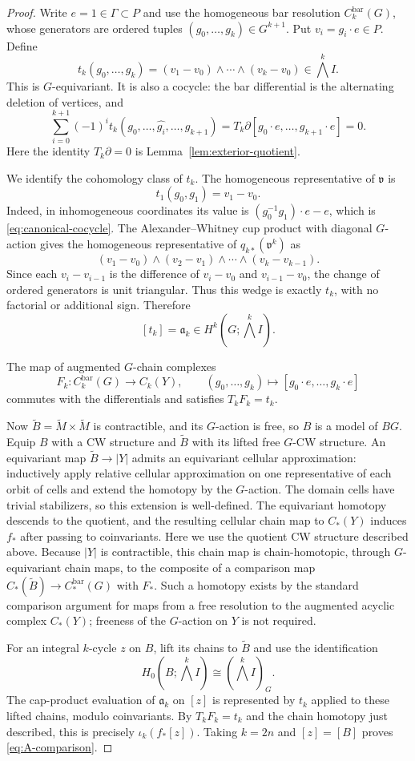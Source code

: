 \begin{proof}
Write $e=1\in\Gamma\subset P$ and use the homogeneous
bar resolution $C_k^{\mathrm{bar}}(G)$, whose generators
are ordered tuples $(g_0,\ldots,g_k)\in G^{k+1}$.
Put $v_i=g_i\cdot e\in P$. Define
\[
 t_k(g_0,\ldots,g_k)
  =(v_1-v_0)\wedge\cdots\wedge(v_k-v_0)
  \in\bigwedge^k I.
\]
This is $G$-equivariant. It is also a cocycle:
the bar differential is the alternating deletion
of vertices, and
\[
 \sum_{i=0}^{k+1}(-1)^i
 t_k(g_0,\ldots,\widehat{g_i},\ldots,g_{k+1})
 =T_k\partial[g_0\cdot e,\ldots,g_{k+1}\cdot e]
 =0.
\]
Here the identity $T_k\partial=0$ is
Lemma~\ref{lem:exterior-quotient}.

We identify the cohomology class of $t_k$. The
homogeneous representative of $\mathfrak v$ is
\[
 t_1(g_0,g_1)=v_1-v_0.
\]
Indeed, in inhomogeneous coordinates its value is
$(g_0^{-1}g_1)\cdot e-e$, which is
\eqref{eq:canonical-cocycle}.
The Alexander--Whitney cup product with diagonal
$G$-action gives the homogeneous representative
of $q_{k*}(\mathfrak v^k)$ as
\[
 (v_1-v_0)\wedge(v_2-v_1)\wedge\cdots
 \wedge(v_k-v_{k-1}).
\]
Since each $v_i-v_{i-1}$ is the difference of
$v_i-v_0$ and $v_{i-1}-v_0$, the change of
ordered generators is unit triangular. Thus this
wedge is exactly $t_k$, with no factorial or
additional sign. Therefore
\[
 [t_k]=\mathfrak a_k\in H^k(G;\bigwedge^k I).
\]

The map of augmented $G$-chain complexes
\[
 F_k:C_k^{\mathrm{bar}}(G)\longrightarrow C_k(Y),
 \qquad
 (g_0,\ldots,g_k)\longmapsto
 [g_0\cdot e,\ldots,g_k\cdot e]
\]
commutes with the differentials and satisfies
$T_k F_k=t_k$.

Now $\widetilde B=\widetilde M\times\widetilde M$
is contractible, and its $G$-action is free, so
$B$ is a model of $BG$. Equip $B$ with a CW structure and $\widetilde B$ with
its lifted free $G$-CW structure. An equivariant map
$\widetilde B\to |Y|$ admits an equivariant cellular
approximation: inductively apply relative cellular
approximation on one representative of each orbit of
cells and extend the homotopy by the $G$-action.
The domain cells have trivial stabilizers, so this
extension is well-defined. The equivariant homotopy
descends to the quotient, and the resulting cellular
chain map to $C_*(Y)$ induces $f_*$ after passing to
coinvariants. Here we use the quotient CW structure
described above.
Because $|Y|$ is contractible, this chain map
is chain-homotopic, through $G$-equivariant
chain maps, to the composite of a comparison
map $C_*(\widetilde B)\to C_*^{\mathrm{bar}}(G)$
with $F_*$. Such a homotopy exists by
the standard comparison argument for maps
from a free resolution to the augmented
acyclic complex $C_*(Y)$; freeness of the
$G$-action on $Y$ is not required.

For an integral $k$-cycle $z$ on $B$, lift its
chains to $\widetilde B$ and use the
identification
\[
 H_0(B;\bigwedge^k I)
 \cong(\bigwedge^k I)_G.
\]
The cap-product evaluation of $\mathfrak a_k$
on $[z]$ is represented by $t_k$ applied to
these lifted chains, modulo coinvariants.
By $T_kF_k=t_k$ and the chain homotopy just
described, this is precisely
$\iota_k(f_*[z])$. Taking
$k=2n$ and $[z]=[B]$ proves
\eqref{eq:A-comparison}.
\end{proof}

